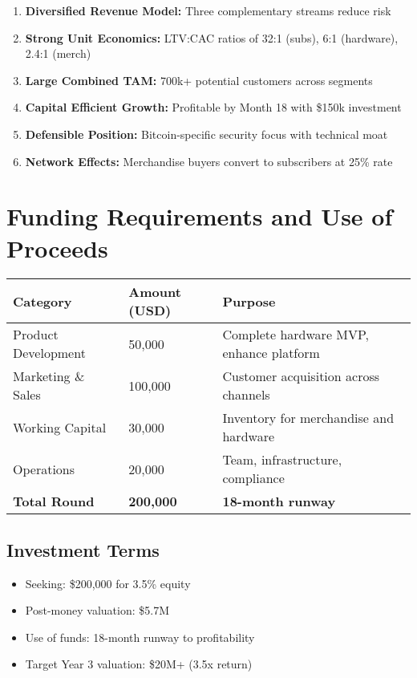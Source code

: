 \documentclass[11pt]{article}
\begin{document}
\begin{enumerate}
  \item \textbf{Diversified Revenue Model:} Three complementary streams reduce risk
  \item \textbf{Strong Unit Economics:} LTV:CAC ratios of 32:1 (subs), 6:1 (hardware), 2.4:1 (merch)
  \item \textbf{Large Combined TAM:} 700k+ potential customers across segments
  \item \textbf{Capital Efficient Growth:} Profitable by Month 18 with \$150k investment
  \item \textbf{Defensible Position:} Bitcoin-specific security focus with technical moat
  \item \textbf{Network Effects:} Merchandise buyers convert to subscribers at 25\% rate
\end{enumerate}

\section{Funding Requirements and Use of Proceeds}

\begin{table}[htbp]
\centering
\begin{tabularx}{\linewidth}{l Y Y}
\toprule
Category & Amount (USD) & Purpose \\\midrule
Product Development & 50,000 & Complete hardware MVP, enhance platform \\
Marketing \& Sales & 100,000 & Customer acquisition across channels \\
Working Capital & 30,000 & Inventory for merchandise and hardware \\
Operations & 20,000 & Team, infrastructure, compliance \\
\textbf{Total Round} & \textbf{200,000} & \textbf{18-month runway} \\
\bottomrule
\end{tabularx}
\end{table}

\subsection{Investment Terms}
\begin{itemize}
  \item Seeking: \$200,000 for 3.5\% equity
  \item Post-money valuation: \$5.7M
  \item Use of funds: 18-month runway to profitability
  \item Target Year 3 valuation: \$20M+ (3.5x return)
\end{itemize}
\end{document}
